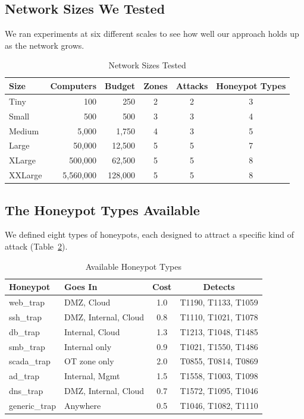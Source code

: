 \documentclass[journal]{IEEEtran}
\begin{document}
\subsection{Network Sizes We Tested}

We ran experiments at six different scales to see how well our
approach holds up as the network grows.

\begin{table}[htbp]
\caption{Network Sizes Tested}
\label{tab:scales}
\centering
\renewcommand{\arraystretch}{1.2}
\begin{tabular}{@{}lrrccc@{}}
\toprule
\textbf{Size} & \textbf{Computers} & \textbf{Budget} &
\textbf{Zones} & \textbf{Attacks} & \textbf{Honeypot Types} \\
\midrule
Tiny    &          100 &    250 & 2 & 2 & 3 \\
Small   &          500 &    500 & 3 & 3 & 4 \\
Medium  &        5,000 &  1,750 & 4 & 3 & 5 \\
Large   &       50,000 & 12,500 & 5 & 5 & 7 \\
XLarge  &      500,000 & 62,500 & 5 & 5 & 8 \\
XXLarge &    5,560,000 &128,000 & 5 & 5 & 8 \\
\bottomrule
\end{tabular}
\end{table}

\subsection{The Honeypot Types Available}

We defined eight types of honeypots, each designed to attract a
specific kind of attack (Table~\ref{tab:profiles}).

\begin{table}[htbp]
\caption{Available Honeypot Types}
\label{tab:profiles}
\centering
\renewcommand{\arraystretch}{1.2}
\begin{tabular}{@{}llcc@{}}
\toprule
\textbf{Honeypot} & \textbf{Goes In} & \textbf{Cost} & \textbf{Detects} \\
\midrule
web\_trap     & DMZ, Cloud          & 1.0 & T1190, T1133, T1059 \\
ssh\_trap     & DMZ, Internal, Cloud& 0.8 & T1110, T1021, T1078 \\
db\_trap      & Internal, Cloud     & 1.3 & T1213, T1048, T1485 \\
smb\_trap     & Internal only       & 0.9 & T1021, T1550, T1486 \\
scada\_trap   & OT zone only        & 2.0 & T0855, T0814, T0869 \\
ad\_trap      & Internal, Mgmt      & 1.5 & T1558, T1003, T1098 \\
dns\_trap     & DMZ, Internal, Cloud& 0.7 & T1572, T1095, T1046 \\
generic\_trap & Anywhere            & 0.5 & T1046, T1082, T1110 \\
\bottomrule
\end{tabular}
\end{table}
\end{document}
